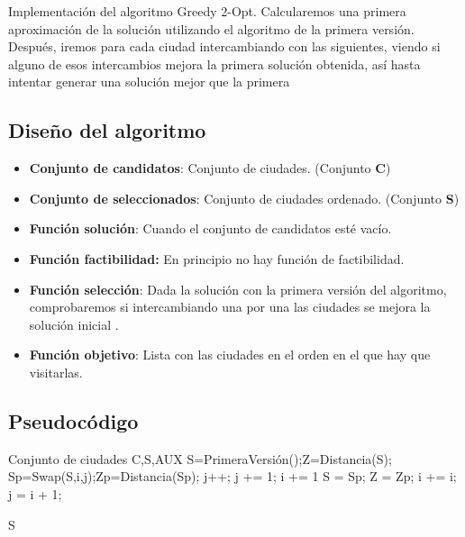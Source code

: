 		Implementación del algoritmo Greedy 2-Opt. Calcularemos una primera aproximación de la solución utilizando el algoritmo de la primera versión. Después, iremos para cada ciudad intercambiando con las siguientes, viendo si alguno de esos intercambios mejora la primera solución obtenida, así hasta intentar generar una solución mejor que la primera
		
	\subsection{Diseño del algoritmo} 
	
		\begin{itemize}
			\item \textbf{Conjunto de candidatos}: Conjunto de ciudades. (Conjunto \textbf{C})
			\item \textbf{Conjunto de seleccionados}: Conjunto de ciudades ordenado. (Conjunto \textbf{S})
			\item \textbf{Función solución}: Cuando el conjunto de candidatos esté vacío.
			\item \textbf{Función factibilidad:} En principio no hay función de factibilidad.
			\item \textbf{Función selección}: Dada la solución con la primera versión del algoritmo, comprobaremos si intercambiando una por una las ciudades se mejora la solución inicial .
			\item \textbf{Función objetivo}: Lista con las ciudades en el orden en el que hay que visitarlas.		
		\end{itemize}
		
		
	\subsection{Pseudocódigo}

		\begin{algorithmic}				
			\Require Conjunto de ciudades C,S,AUX
			\State S=PrimeraVersión();Z=Distancia(S);
			\State Sp=Swap(S,i,j);Zp=Distancia(Sp);
			\State j++;
			\EndIf
			\State j += 1; i += 1
			\EndIf
			\State S = Sp; Z = Zp;
			\State i += i; j = i + 1;
			\EndIf
			\EndWhile  
			
			\Return S	
			
			
			
		\end{algorithmic}
		

